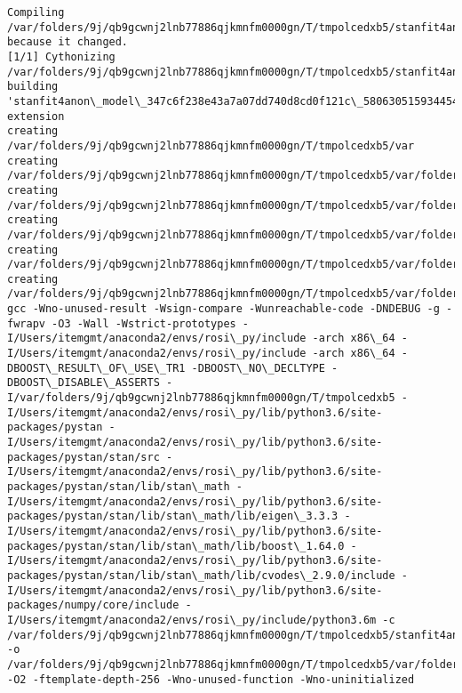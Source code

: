 \documentclass[11pt]{article}
\begin{document}
    \begin{Verbatim}[commandchars=\\\{\}]
Compiling /var/folders/9j/qb9gcwnj2lnb77886qjkmnfm0000gn/T/tmpolcedxb5/stanfit4anon\_model\_347c6f238e43a7a07dd740d8cd0f121c\_5806305159344542127.pyx because it changed.
[1/1] Cythonizing /var/folders/9j/qb9gcwnj2lnb77886qjkmnfm0000gn/T/tmpolcedxb5/stanfit4anon\_model\_347c6f238e43a7a07dd740d8cd0f121c\_5806305159344542127.pyx
building 'stanfit4anon\_model\_347c6f238e43a7a07dd740d8cd0f121c\_5806305159344542127' extension
creating /var/folders/9j/qb9gcwnj2lnb77886qjkmnfm0000gn/T/tmpolcedxb5/var
creating /var/folders/9j/qb9gcwnj2lnb77886qjkmnfm0000gn/T/tmpolcedxb5/var/folders
creating /var/folders/9j/qb9gcwnj2lnb77886qjkmnfm0000gn/T/tmpolcedxb5/var/folders/9j
creating /var/folders/9j/qb9gcwnj2lnb77886qjkmnfm0000gn/T/tmpolcedxb5/var/folders/9j/qb9gcwnj2lnb77886qjkmnfm0000gn
creating /var/folders/9j/qb9gcwnj2lnb77886qjkmnfm0000gn/T/tmpolcedxb5/var/folders/9j/qb9gcwnj2lnb77886qjkmnfm0000gn/T
creating /var/folders/9j/qb9gcwnj2lnb77886qjkmnfm0000gn/T/tmpolcedxb5/var/folders/9j/qb9gcwnj2lnb77886qjkmnfm0000gn/T/tmpolcedxb5
gcc -Wno-unused-result -Wsign-compare -Wunreachable-code -DNDEBUG -g -fwrapv -O3 -Wall -Wstrict-prototypes -I/Users/itemgmt/anaconda2/envs/rosi\_py/include -arch x86\_64 -I/Users/itemgmt/anaconda2/envs/rosi\_py/include -arch x86\_64 -DBOOST\_RESULT\_OF\_USE\_TR1 -DBOOST\_NO\_DECLTYPE -DBOOST\_DISABLE\_ASSERTS -I/var/folders/9j/qb9gcwnj2lnb77886qjkmnfm0000gn/T/tmpolcedxb5 -I/Users/itemgmt/anaconda2/envs/rosi\_py/lib/python3.6/site-packages/pystan -I/Users/itemgmt/anaconda2/envs/rosi\_py/lib/python3.6/site-packages/pystan/stan/src -I/Users/itemgmt/anaconda2/envs/rosi\_py/lib/python3.6/site-packages/pystan/stan/lib/stan\_math -I/Users/itemgmt/anaconda2/envs/rosi\_py/lib/python3.6/site-packages/pystan/stan/lib/stan\_math/lib/eigen\_3.3.3 -I/Users/itemgmt/anaconda2/envs/rosi\_py/lib/python3.6/site-packages/pystan/stan/lib/stan\_math/lib/boost\_1.64.0 -I/Users/itemgmt/anaconda2/envs/rosi\_py/lib/python3.6/site-packages/pystan/stan/lib/stan\_math/lib/cvodes\_2.9.0/include -I/Users/itemgmt/anaconda2/envs/rosi\_py/lib/python3.6/site-packages/numpy/core/include -I/Users/itemgmt/anaconda2/envs/rosi\_py/include/python3.6m -c /var/folders/9j/qb9gcwnj2lnb77886qjkmnfm0000gn/T/tmpolcedxb5/stanfit4anon\_model\_347c6f238e43a7a07dd740d8cd0f121c\_5806305159344542127.cpp -o /var/folders/9j/qb9gcwnj2lnb77886qjkmnfm0000gn/T/tmpolcedxb5/var/folders/9j/qb9gcwnj2lnb77886qjkmnfm0000gn/T/tmpolcedxb5/stanfit4anon\_model\_347c6f238e43a7a07dd740d8cd0f121c\_5806305159344542127.o -O2 -ftemplate-depth-256 -Wno-unused-function -Wno-uninitialized

\end{Verbatim}
\end{document}
